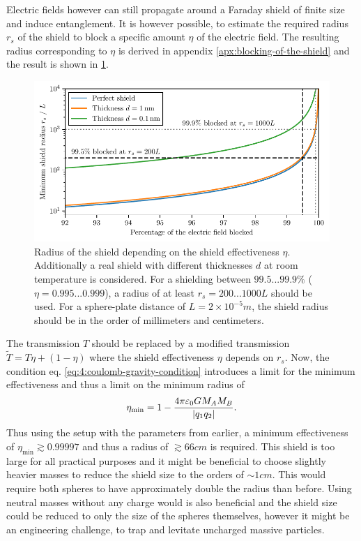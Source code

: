 Electric fields however can still propagate around a Faraday shield of finite size and induce entanglement. It is however possible, to estimate the required radius $r_s$ of the shield to block a specific amount $\eta$ of the electric field.
The resulting radius corresponding to $\eta$ is derived in appendix \ref{apx:blocking-of-the-shield} and the result is shown in \cref{fig:4:shield-radius}.
\begin{figure}[!ht]
  \centering
  \includegraphics[width=\textwidth]{./../figures/shield-radius.pdf}
  \caption{Radius of the shield depending on the shield effectiveness $\eta$. Additionally a real shield with different thicknesses $d$ at room temperature is considered. For a shielding between $99.5...99.9\%$ ($\eta = 0.995...0.999$), a radius of at least $r_s =200...1000L$ should be used. For a sphere-plate distance of $L=2 \times 10^{-5}\si{m}$, the shield radius should be in the order of millimeters and centimeters.}
  \label{fig:4:shield-radius}
\end{figure}
The transmission $T$ should be replaced by a modified transmission $\tilde{T} = T\eta + (1-\eta)$ where the shield effectiveness $\eta$ depends on $r_s$. 
Now, the condition eq. \eqref{eq:4:coulomb-gravity-condition} introduces a limit for the minimum effectiveness and thus a limit on the minimum radius of
\begin{equation}
  \eta_\mathrm{min} = 1 - \frac{4\pi \varepsilon_0 G M_A M_B}{\left\lvert q_1 q_2\right\rvert} .
\end{equation}
Thus using the setup with the parameters from earlier, a minimum effectiveness of $\eta_\mathrm{min} \gtrsim 0.99997$ and thus a radius of $\gtrsim 66\si{cm}$ is required.
This shield is too large for all practical purposes and it might be beneficial to choose slightly heavier masses to reduce the shield size to the orders of $\sim 1\si{cm}$. This would require both spheres to have approximately double the radius than before.
Using neutral masses without any charge would is also beneficial and the shield size could be reduced to only the size of the spheres themselves, however it might be an engineering challenge, to trap and levitate uncharged massive particles.





